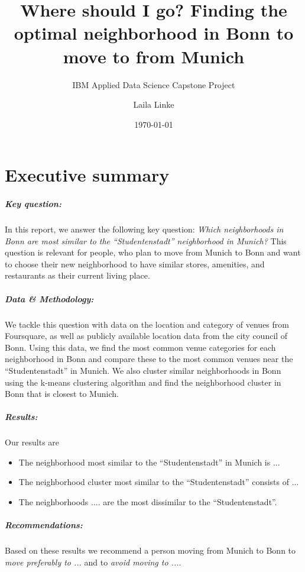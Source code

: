 \documentclass[UKenglish]{scrreprt}
\title{Where should I go? Finding the optimal neighborhood in Bonn to move to from Munich}
\subtitle{IBM Applied Data Science Capstone Project}
\author{Laila Linke}
\date{\today}
\begin{document}
\maketitle

\chapter*{Executive summary}

\paragraph{Key question:}In this report, we answer the following key question: \emph{Which neighborhoods in Bonn are most similar to the \enquote{Studentenstadt} neighborhood in Munich?} This question is relevant for people, who plan to move from Munich to Bonn and want to choose their new neighborhood to have similar stores, amenities, and restaurants as their current living place. 

\paragraph{Data \& Methodology:}We tackle this question with data on the location and category of venues from Foursquare, as well as publicly available location data from the city council of Bonn. Using this data, we find the most common venue categories for each neighborhood in Bonn and compare these to the most common venues near the \enquote{Studentenstadt} in Munich. We also cluster similar neighborhoods in Bonn using the k-means clustering algorithm and find the neighborhood cluster in Bonn that is closest to Munich. 

\paragraph{Results:}Our results are
\begin{itemize}
	\item The neighborhood most similar to the \enquote{Studentenstadt} in Munich is ...
	\item The neighborhood cluster most similar to the \enquote{Studentenstadt} consists of ...
	\item The neighborhoods .... are the most dissimilar to the \enquote{Studentenstadt}.
\end{itemize}

\paragraph{Recommendations:}Based on these results we recommend a person moving from Munich to Bonn to \emph{move preferably to ...} and to \emph{avoid moving to ...}.
\end{document}
